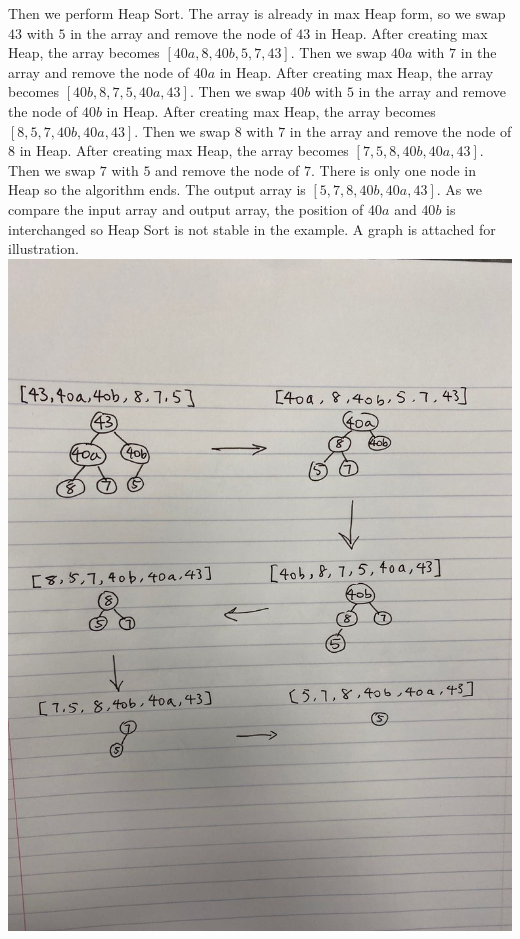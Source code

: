 \documentclass[10pt]{article}
\begin{document}
Then we perform Heap Sort. The array is already in max Heap form, so we swap $43$ with $5$ in the array and remove the node of $43$ in Heap. After creating max Heap, the array becomes $[40a, 8, 40b, 5, 7, 43]$. Then we swap $40a$ with $7$ in the array and remove the node of $40a$ in Heap. After creating max Heap, the array becomes $[40b, 8, 7, 5, 40a, 43]$.
Then we swap $40b$ with $5$ in the array and remove the node of $40b$ in Heap. After creating max Heap, the array becomes $[8, 5, 7, 40b, 40a, 43]$.
Then we swap $8$ with $7$ in the array and remove the node of $8$ in Heap. After creating max Heap, the array becomes $[7, 5, 8, 40b, 40a, 43]$. Then we swap $7$ with $5$ and remove the node of $7$. There is only one node in Heap so the algorithm ends. The output array is $[5, 7, 8, 40b, 40a, 43]$. As we compare the input array and output array, the position of $40a$ and $40b$ is interchanged so Heap Sort is not stable in the example. A graph is attached for illustration.
\includegraphics[scale=0.2]{pic2.jpeg}
%
%
\end{document}
